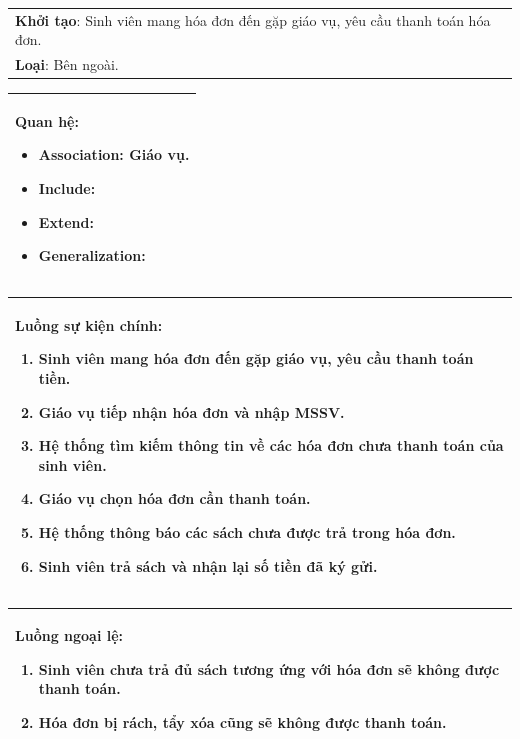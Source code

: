 \documentclass[../report.tex]{subfiles}
\begin{document}
\begin{center}
\begin{tabular}{| m{15.9cm} |}
    \hline
    \textbf{Khởi tạo}: Sinh viên mang hóa đơn đến gặp giáo vụ, yêu cầu thanh toán hóa đơn. \\
    \textbf{Loại}: Bên ngoài.  \\
    \hline
\end{tabular}

\begin{tabular}{| m{15.9cm} |}
    \hline
    \textbf{Quan hệ}:
    \begin{itemize}
        \item Association: Giáo vụ. 
        \item Include: 
        \item Extend: 
        \item Generalization: 
    \end{itemize} \\
    \hline
\end{tabular}

\begin{tabular}{| m{15.9cm} |}
    \hline
    \textbf{Luồng sự kiện chính}:
    \begin{enumerate}
        \item Sinh viên mang hóa đơn đến gặp giáo vụ, yêu cầu thanh toán tiền. 
        \item Giáo vụ tiếp nhận hóa đơn và nhập MSSV. 
        \item Hệ thống tìm kiếm thông tin về các hóa đơn chưa thanh toán của sinh viên. 
        \item Giáo vụ chọn hóa đơn cần thanh toán. 
        \item Hệ thống thông báo các sách chưa được trả trong hóa đơn. 
        \item Sinh viên trả sách và nhận lại số tiền đã ký gửi. 
    \end{enumerate} \\
    \hline
\end{tabular}

\begin{tabular}{| m{15.9cm} |}
    \hline
    \textbf{Luồng ngoại lệ}:
    \begin{enumerate}
        \item Sinh viên chưa trả đủ sách tương ứng với hóa đơn sẽ không được thanh toán. 
        \item Hóa đơn bị rách, tẩy xóa cũng sẽ không được thanh toán. 
    \end{enumerate} \\
    \hline
\end{tabular}


\end{center}
\end{document}
